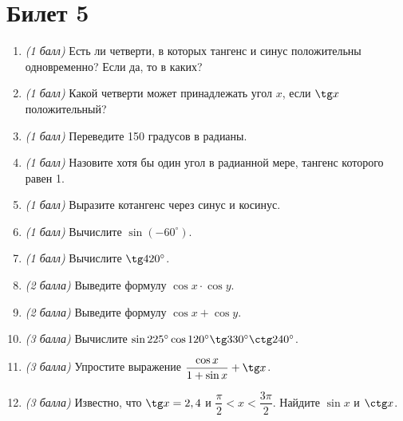 \documentclass[12pt, a4paper]{article}
\begin{document}
	\section*{Билет 5}
	\begin{enumerate}
		\item \textit{(1 балл)} Есть ли четверти, в которых тангенс и синус положительны одновременно? Если да, то в каких?
		\item \textit{(1 балл)} Какой четверти может принадлежать угол $x$, если $\tg x$ положительный?
		\item \textit{(1 балл)} Переведите 150 градусов в радианы.
		\item \textit{(1 балл)}	Назовите хотя бы один угол в радианной мере, тангенс которого равен 1.
		\item \textit{(1 балл)} Выразите котангенс через синус и косинус.
		\item \textit{(1 балл)} Вычислите $\sin (-60^{\circ})$.
		\item \textit{(1 балл)} Вычислите $\tg 420^{\circ}$.
		\item \textit{(2 балла)} Выведите формулу $\cos x \cdot \cos y$.
		\item \textit{(2 балла)} Выведите формулу $\cos x + \cos y$.
		\item \textit{(3 балла)} Вычислите $\sin 225^{\circ} \cos 120^{\circ} \tg 330^{\circ} \ctg 240^{\circ}$.
		\item \textit{(3 балла)} Упростите выражение $\dfrac{\cos x}{1+\sin x}+ \tg x$.
		\item \textit{(3 балла)} Известно, что $\tg x=2,4$ и $\dfrac{\pi}{2}<x<\dfrac{3\pi}{2}$. Найдите $\sin x$ и $\ctg x$.
	\end{enumerate}
	
\end{document}
